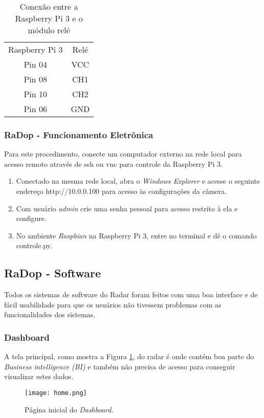 \begin{table}[H]
\centering
\caption{Conexão entre a Raspberry Pi 3 e o módulo relé}
\begin{tabular}{cc}
Raspberry Pi 3 & Relé \\
Pin 04         & VCC  \\
Pin 08         & CH1  \\
Pin 10         & CH2  \\
Pin 06         & GND 
\end{tabular}

\label{mon}
\end{table}


\subsubsection{RaDop - Funcionamento Eletrônica}
Para este procedimento, conecte um computador externo na rede local para acesso remoto através de ssh ou vnc para controle da Raspberry Pi 3.
  \begin{enumerate} 
\item Conectado na mesma rede local, abra o \emph{Windows Explorer} e acesse o seguinte endereço http://10.0.0.100 para acesso às configurações da câmera.
\item Com usuário \emph{admin} crie uma senha pessoal para acesso restrito à ela e configure.
\item No ambiente \emph{Raspbian} na Raspberry Pi 3, entre no terminal e dê o comando controle.py.
\end{enumerate}

\subsection{RaDop - Software}

Todos os sistemas de software do Radar foram feitos com uma boa interface e de fácil usabilidade para que os usuários não tivessem problemas com as funcionalidades dos sistemas. 

\subsubsection{Dashboard}

A tela principal, como mostra a Figura \ref{home}, do radar é onde contém boa parte do \textit{Business intelligence (BI)} e também não precisa de acesso para conseguir visualizar estes dados.


  \begin{figure}[H]
     \centering
     \texttt{[image: home.png]}
     \caption{Página inicial do \textit{Dashboard}.}
     \label{home}
 \end{figure}

